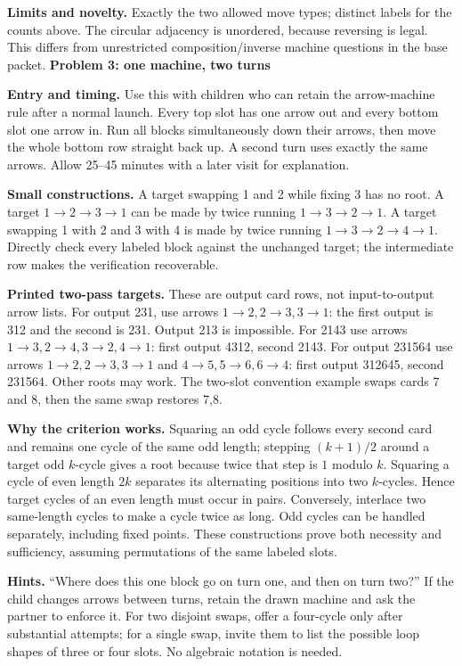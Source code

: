 \documentclass[11pt]{article}
\newcommand\lead[1]{\textbf{#1}\par}
\begin{document}
\textbf{Limits and novelty.} Exactly the two allowed move types; distinct labels for the counts above. The circular adjacency is unordered, because reversing is legal. This differs from unrestricted composition/inverse machine questions in the base packet.
\newpage
\lead{Problem 3: one machine, two turns}
\textbf{Entry and timing.} Use this with children who can retain the arrow-machine rule after a normal launch. Every top slot has one arrow out and every bottom slot one arrow in. Run all blocks simultaneously down their arrows, then move the whole bottom row straight back up. A second turn uses exactly the same arrows. Allow 25--45 minutes with a later visit for explanation.

\textbf{Small constructions.} A target swapping 1 and 2 while fixing 3 has no root. A target $1\to 2\to 3\to 1$ can be made by twice running $1\to 3\to 2\to 1$. A target swapping 1 with 2 and 3 with 4 is made by twice running $1\to 3\to 2\to 4\to 1$. Directly check every labeled block against the unchanged target; the intermediate row makes the verification recoverable.

\textbf{Printed two-pass targets.} These are output card rows, not input-to-output arrow lists. For output 231, use arrows $1\to2,2\to3,3\to1$: the first output is 312 and the second is 231. Output 213 is impossible. For 2143 use arrows $1\to3,2\to4,3\to2,4\to1$: first output 4312, second 2143. For output 231564 use arrows $1\to2,2\to3,3\to1$ and $4\to5,5\to6,6\to4$: first output 312645, second 231564. Other roots may work. The two-slot convention example swaps cards 7 and 8, then the same swap restores 7,8.

\textbf{Why the criterion works.} Squaring an odd cycle follows every second card and remains one cycle of the same odd length; stepping $(k+1)/2$ around a target odd $k$-cycle gives a root because twice that step is $1$ modulo $k$. Squaring a cycle of even length $2 k$ separates its alternating positions into two $k$-cycles. Hence target cycles of an even length must occur in pairs. Conversely, interlace two same-length cycles to make a cycle twice as long. Odd cycles can be handled separately, including fixed points. These constructions prove both necessity and sufficiency, assuming permutations of the same labeled slots.

\textbf{Hints.} ``Where does this one block go on turn one, and then on turn two?'' If the child changes arrows between turns, retain the drawn machine and ask the partner to enforce it. For two disjoint swaps, offer a four-cycle only after substantial attempts; for a single swap, invite them to list the possible loop shapes of three or four slots. No algebraic notation is needed.
\end{document}
